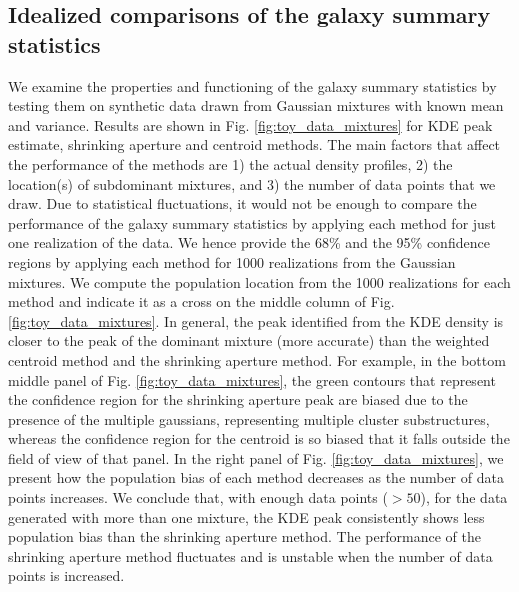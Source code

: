\documentclass[usenatbib]{mn2e}
\begin{document}
{%
\subsection{Idealized comparisons of the galaxy summary statistics}
We examine the properties and functioning of the galaxy summary statistics by testing them on synthetic data drawn
from Gaussian mixtures with known mean and variance. 
Results are shown in Fig.
\ref{fig:toy_data_mixtures} for KDE peak estimate, shrinking aperture and centroid methods. 
The main factors that affect the performance of 
the methods are 1) the actual density profiles, 2) the location(s) of subdominant mixtures, and 3) the number of data points that we draw.
Due to statistical fluctuations, it would not be enough to
compare the performance of the galaxy summary statistics by applying each method for just one realization of the
data. We hence provide the 68\% and the 95\% confidence regions by applying
each method for 1000 realizations from the Gaussian mixtures.
We compute the population location from the 1000 realizations for each method 
and indicate it as a cross on the middle column of Fig. \ref{fig:toy_data_mixtures}.
In general, the peak identified from the KDE density is closer to the 
peak of the dominant mixture (more accurate) than 
the weighted centroid method and the shrinking aperture method.
For example, in the bottom middle panel of Fig. \ref{fig:toy_data_mixtures}, 
the green contours that represent the confidence region for the shrinking aperture peak are
biased due to the presence of the multiple gaussians, representing multiple cluster substructures, whereas the confidence region for the centroid 
is so biased that it falls outside the field of view of that panel.
In the right panel of Fig. \ref{fig:toy_data_mixtures}, 
we present how the population bias of each method decreases as the
number of data points increases. We conclude that, with enough data points ($> 50$), 
for the data generated with more than one mixture, 
the KDE peak consistently shows less population bias than the shrinking aperture method. 
The performance of the shrinking aperture method fluctuates and is unstable when
the number of data points is increased.

}
\end{document}
